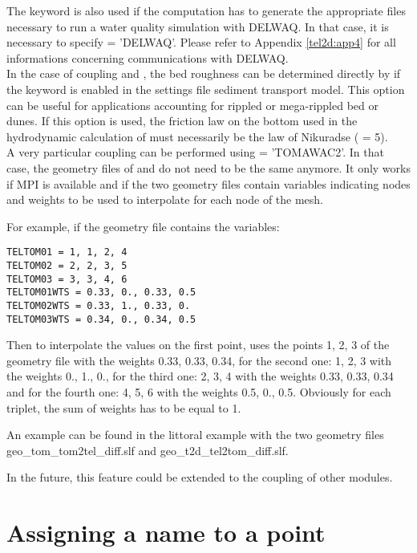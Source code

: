 The keyword  is also used if the computation
has to generate the appropriate files necessary to run a water quality
simulation with DELWAQ.
In that case, it is necessary to specify  = 'DELWAQ'.
Please refer to Appendix \ref{tel2d:app4} for all informations concerning
communications with DELWAQ.\\

In the case of coupling  and \sisyphe, the bed roughness can be
determined directly by \sisyphe if the keyword
 is enabled in the settings file
sediment transport model. This option can be useful for applications
accounting for rippled or mega-rippled bed or dunes.
If this option is used, the friction law on the bottom used
in the hydrodynamic calculation of  must necessarily be
the law of Nikuradse ( = 5).\\

A very particular coupling can be performed using  =
'TOMAWAC2'.
In that case, the geometry files of  and \tomawac do not need
to be the same anymore.
It only works if MPI is available and if the two geometry files contain
variables indicating nodes and weights to be used to interpolate for each node
of the mesh.

For example, if the \tomawac geometry file contains the variables:

\begin{lstlisting}
TELTOM01 = 1, 1, 2, 4
TELTOM02 = 2, 2, 3, 5
TELTOM03 = 3, 3, 4, 6
TELTOM01WTS = 0.33, 0., 0.33, 0.5
TELTOM02WTS = 0.33, 1., 0.33, 0.
TELTOM03WTS = 0.34, 0., 0.34, 0.5
\end{lstlisting}

Then to interpolate the values on the first point,
\tomawac uses the points 1, 2, 3 of the  geometry file with the
weights 0.33, 0.33, 0.34,
for the second one: 1, 2, 3 with the weights 0., 1., 0.,
for the third one: 2, 3, 4 with the weights 0.33, 0.33, 0.34
and for the fourth one: 4, 5, 6 with the weights 0.5, 0., 0.5.
Obviously for each triplet, the sum of weights has to be equal to 1.

An example can be found in the littoral \sisyphe example with the two
geometry files geo\_tom\_tom2tel\_diff.slf and
geo\_t2d\_tel2tom\_diff.slf.

In the future, this feature could be extended to the coupling of other modules.


\section{Assigning a name to a point}

